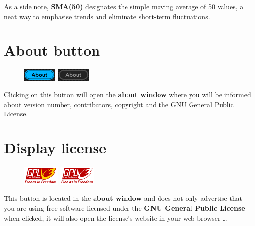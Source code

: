 As a side note, \textbf{SMA(50)} designates the simple moving average
of 50 values, a neat way to emphasise trends and eliminate short-term
fluctuations.

\section{About button}

\begin{figure}
  \includegraphics[scale=\screenshotscale,clip]{include/images/button_about_on.png}
  \newline \vspace{-0.9\baselineskip}
  \includegraphics[scale=\screenshotscale,clip]{include/images/button_about_off.png}
\end{figure}

Clicking on this button will open the \textbf{about window} where you
will be informed about version number, contributors, copyright and the
GNU General Public License.

\section{Display license}

\begin{figure}
  \includegraphics[scale=\screenshotscale,clip]{include/images/button_gpl_on.png}
  \newline \vspace{-0.9\baselineskip}
  \includegraphics[scale=\screenshotscale,clip]{include/images/button_gpl_off.png}
\end{figure}

This button is located in the \textbf{about window} and does not only
advertise that you are using free software licensed under the
\textbf{GNU General Public License} -- when clicked, it will also open
the license's website in your web browser \dots

